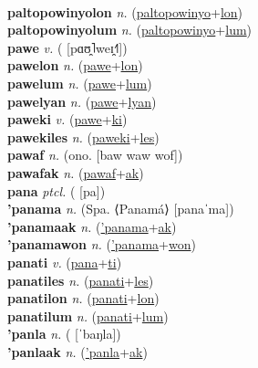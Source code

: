 \label{paltopowinyo} \\
\textbf{paltopowinyolon} \textit{n.} (\hyperref[paltopowinyo]{paltopowinyo}+\hyperref[lon]{lon})
 \label{paltopowinyolon} \\
\textbf{paltopowinyolum} \textit{n.} (\hyperref[paltopowinyo]{paltopowinyo}+\hyperref[lum]{lum})
 \label{paltopowinyolum} \\
\textbf{pawe} \textit{v.} ( [pɑʊ̯˥weɪ̯˧˥])
 \label{pawe} \\
\textbf{pawelon} \textit{n.} (\hyperref[pawe]{pawe}+\hyperref[lon]{lon})
 \label{pawelon} \\
\textbf{pawelum} \textit{n.} (\hyperref[pawe]{pawe}+\hyperref[lum]{lum})
 \label{pawelum} \\
\textbf{pawelyan} \textit{n.} (\hyperref[pawe]{pawe}+\hyperref[lyan]{lyan})
 \label{pawelyan} \\
\textbf{paweki} \textit{v.} (\hyperref[pawe]{pawe}+\hyperref[ki]{ki})
 \label{paweki} \\
\textbf{pawekiles} \textit{n.} (\hyperref[paweki]{paweki}+\hyperref[les]{les})
 \label{pawekiles} \\
\textbf{pawaf} \textit{n.} (ono. [baw waw wof])
 \label{pawaf} \\
\textbf{pawafak} \textit{n.} (\hyperref[pawaf]{pawaf}+\hyperref[ak]{ak})
 \label{pawafak} \\
\textbf{pana} \textit{ptcl.} ( [pa])
 \label{pana} \\
\textbf{'panama} \textit{n.} (Spa. ⟨Panamá⟩ [panaˈma])
 \label{'panama} \\
\textbf{'panamaak} \textit{n.} (\hyperref['panama]{'panama}+\hyperref[ak]{ak})
 \label{'panamaak} \\
\textbf{'panamawon} \textit{n.} (\hyperref['panama]{'panama}+\hyperref[won]{won})
 \label{'panamawon} \\
\textbf{panati} \textit{v.} (\hyperref[pana]{pana}+\hyperref[ti]{ti})
 \label{panati} \\
\textbf{panatiles} \textit{n.} (\hyperref[panati]{panati}+\hyperref[les]{les})
 \label{panatiles} \\
\textbf{panatilon} \textit{n.} (\hyperref[panati]{panati}+\hyperref[lon]{lon})
 \label{panatilon} \\
\textbf{panatilum} \textit{n.} (\hyperref[panati]{panati}+\hyperref[lum]{lum})
 \label{panatilum} \\
\textbf{'panla} \textit{n.} ( [ˈbaŋla])
 \label{'panla} \\
\textbf{'panlaak} \textit{n.} (\hyperref['panla]{'panla}+\hyperref[ak]{ak})
